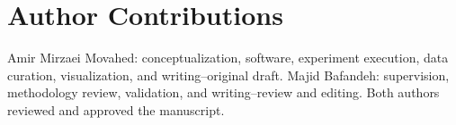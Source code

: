 \documentclass[10pt,journal,compsoc]{IEEEtran}
\begin{document}
\section*{Author Contributions}
Amir Mirzaei Movahed: conceptualization, software, experiment execution, data curation, visualization, and writing--original draft. Majid Bafandeh: supervision, methodology review, validation, and writing--review and editing. Both authors reviewed and approved the manuscript.



\end{document}
